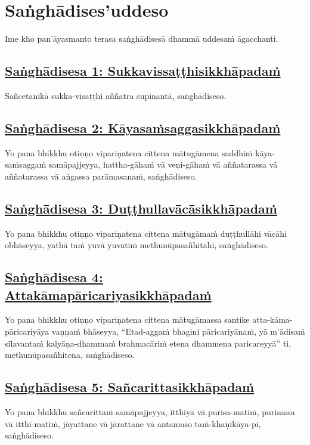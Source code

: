 \setsecheadstyle{\sectionFmt}
\section{Saṅghādises'uddeso}
\label{sd}

\begin{intro}
  Ime kho pan'āyasmanto terasa saṅghādisesā dhammā uddesaṁ āgacchanti.
\end{intro}

\subsection*{\hyperref[comm1]{Saṅghādisesa 1: Sukkavissaṭṭhisikkhāpadaṁ}}
\label{sd1}
Sañcetanikā sukka-visaṭṭhi aññatra supinantā, saṅghādiseso.

\subsection*{\hyperref[comm2]{Saṅghādisesa 2: Kāyasaṁsaggasikkhāpadaṁ}}
\label{sd2}
Yo pana bhikkhu otiṇṇo vipariṇatena cittena mātugāmena saddhiṁ kāya-saṁsaggaṁ samāpajjeyya, hattha-gāhaṁ vā veṇi-gāhaṁ vā aññatarassa vā aññatarassa vā aṅgassa parāmasanaṁ, saṅghādiseso.

\subsection*{\hyperref[comm3]{Saṅghādisesa 3: Duṭṭhullavācāsikkhāpadaṁ}}
\label{sd3}
Yo pana bhikkhu otiṇṇo vipariṇatena cittena mātugāmaṁ duṭṭhullāhi vācāhi obhāseyya, yathā taṁ yuvā yuvatiṁ methunūpasañhitāhi, saṅghādiseso.

\subsection*{\hyperref[comm4]{Saṅghādisesa 4: Attakāmapāricariyasikkhāpadaṁ}}
\label{sd4}
Yo pana bhikkhu otiṇṇo vipariṇatena cittena mātugāmassa santike atta-kāma-pāricariyāya vaṇṇaṁ bhāseyya, “Etad-aggaṁ bhagini pāricariyānaṁ, yā m’ādisaṁ sīlavantaṁ kalyāṇa-dhammaṁ brahmacāriṁ etena dhammena paricareyyā” ti, methunūpasañhitena, saṅghādiseso.

\subsection*{\hyperref[comm5]{Saṅghādisesa 5: Sañcarittasikkhāpadaṁ}}
\label{sd5}
Yo pana bhikkhu sañcarittaṁ samāpajjeyya, itthiyā vā purisa-matiṁ, purisassa vā itthī-matiṁ, jāyattane vā jārattane vā antamaso taṁ-khaṇikāya-pi, saṅghādiseso.

